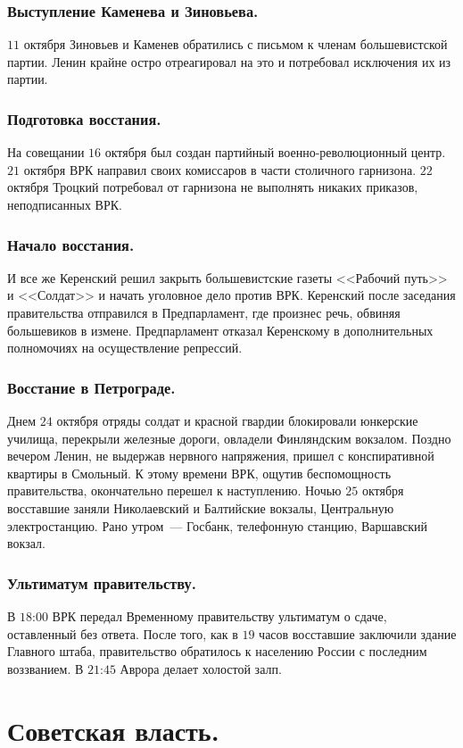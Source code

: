 \documentclass[12pt]{article}
\begin{document}
	\subsubsection{Выступление Каменева и Зиновьева.}
	$11$ октября Зиновьев и Каменев обратились с письмом к членам большевистской партии. Ленин крайне остро отреагировал на это и потребовал исключения их из партии.
	\subsubsection{Подготовка восстания.}
	На совещании $16$ октября был создан партийный военно-революционный центр. $21$ октября ВРК направил своих комиссаров в части столичного гарнизона. $22$ октября Троцкий потребовал от гарнизона не выполнять никаких приказов, неподписанных ВРК.
	\subsubsection{Начало восстания.}
	И все же Керенский решил закрыть большевистские газеты <<Рабочий путь>> и <<Солдат>> и начать уголовное дело против ВРК. Керенский после заседания правительства отправился в Предпарламент, где произнес речь, обвиняя большевиков в измене. Предпарламент отказал Керенскому в дополнительных полномочиях на осуществление репрессий.
	\subsubsection{Восстание в Петрограде.}
	Днем $24$ октября отряды солдат и красной гвардии блокировали юнкерские училища, перекрыли железные дороги, овладели Финляндским вокзалом. Поздно вечером Ленин, не выдержав нервного напряжения, пришел с конспиративной квартиры в Смольный. К этому времени ВРК, ощутив беспомощность правительства, окончательно перешел к наступлению. Ночью $25$ октября восставшие заняли Николаевский и Балтийские вокзалы, Центральную электростанцию. Рано утром~--- Госбанк, телефонную станцию, Варшавский вокзал.
	\subsubsection{Ультиматум правительству.}
	В $18$:$00$ ВРК передал Временному правительству ультиматум о сдаче, оставленный без ответа. После того, как в $19$ часов восставшие заключили здание Главного штаба, правительство обратилось к населению России с последним воззванием. В $21$:$45$ Аврора делает холостой залп.
	\section{Советская власть.}
\end{document}
